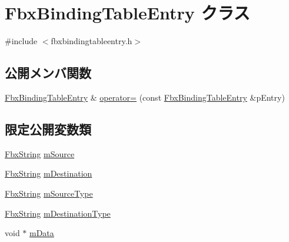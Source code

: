 \hypertarget{class_fbx_binding_table_entry}{}\section{Fbx\+Binding\+Table\+Entry クラス}
\label{class_fbx_binding_table_entry}


{\ttfamily \#include $<$fbxbindingtableentry.\+h$>$}

\subsection*{公開メンバ関数}
\begin{DoxyCompactItemize}
\item 
\hyperlink{class_fbx_binding_table_entry}{Fbx\+Binding\+Table\+Entry} \& \hyperlink{class_fbx_binding_table_entry_ae1019a3507f988ab66e09adb93326ae4}{operator=} (const \hyperlink{class_fbx_binding_table_entry}{Fbx\+Binding\+Table\+Entry} \&p\+Entry)
\end{DoxyCompactItemize}
\subsection*{限定公開変数類}
\begin{DoxyCompactItemize}
\item 
\hyperlink{class_fbx_string}{Fbx\+String} \hyperlink{class_fbx_binding_table_entry_a9fe2b8742a77e290a15287b4dbc1df74}{m\+Source}
\item 
\hyperlink{class_fbx_string}{Fbx\+String} \hyperlink{class_fbx_binding_table_entry_adf7efee81ae6e2f07a52e112f8345df9}{m\+Destination}
\item 
\hyperlink{class_fbx_string}{Fbx\+String} \hyperlink{class_fbx_binding_table_entry_ad2f8a7934ffbeb6eb7bc83fa5f5e8d06}{m\+Source\+Type}
\item 
\hyperlink{class_fbx_string}{Fbx\+String} \hyperlink{class_fbx_binding_table_entry_a569eeb447b060f779b4dced59c962af8}{m\+Destination\+Type}
\item 
void $\ast$ \hyperlink{class_fbx_binding_table_entry_a2fd0df2140365960261ac038b797f0f3}{m\+Data}
\end{DoxyCompactItemize}
